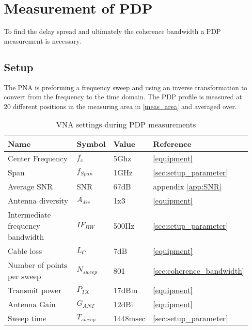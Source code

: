 \chapter{Measurement of PDP}
To find the delay spread and ultimately the coherence bandwidth a \gls{PDP} measurement is necessary. 
\section{Setup}
The PNA is preforming a frequency sweep and using an inverse transformation to convert from the frequency to the time domain.
The PDP profile is measured at 20 different positions in the measuring area in \autoref{meas_area} and averaged over. 

\begin{table}[H]
\centering
\begin{tabular}{|l|l|l|l|}
\hline
\textbf{Name}					& \textbf{Symbol} & \textbf{Value} 	& \textbf{Reference} 		\\ \hline
Center Frequency                & $f_c$       	& 5Ghz              & \autoref{equipment}		\\ \hline
Span 							& $f_{Span}$ 	& 1GHz 				& \autoref{sec:setup_parameter} \\ \hline
Average SNR	                   	& SNR          	& 67dB            	& appendix  \ref{app:SNR} 	\\ \hline
Antenna diversity               & $A_{div}$   	& 1x3    			& \autoref{equipment} 		\\ \hline
Intermediate frequency bandwidth & $IF_{BW}$    & 500Hz   			& \autoref{sec:setup_parameter} \\ \hline
Cable loss 						& $L_{C}$     	& 7dB         		& \autoref{equipment} 		\\ \hline
Number of points per sweep 		& $N_{sweep}$ 	& 801				& \autoref{sec:coherence_bandwidth} \\ \hline
Transmit power 					& $P_{TX}$ 		& 17dBm				& \autoref{equipment} 		\\ \hline
Antenna Gain 					& $G_{ANT}$ 	& 12dBi 			& \autoref{equipment} \\ \hline
Sweep time 						& $T_{sweep}$ 	& 1448msec			& \autoref{sec:setup_parameter} \\ \hline
\end{tabular}
\caption{VNA settings during PDP measurements}
\label{pdp_specs}
\end{table}

%
%

